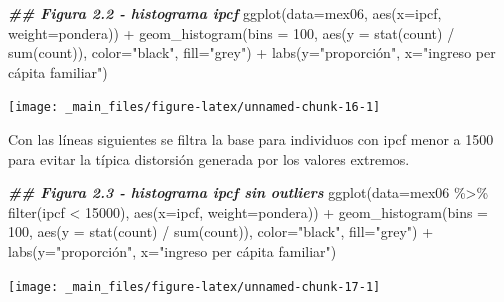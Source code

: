 \documentclass[
]{book}
\newenvironment{Shaded}{\begin{snugshade}}{\end{snugshade}}
\newcommand{\AttributeTok}[1]{\textcolor[rgb]{0.77,0.63,0.00}{#1}}
\newcommand{\DecValTok}[1]{\textcolor[rgb]{0.00,0.00,0.81}{#1}}
\newcommand{\DocumentationTok}[1]{\textcolor[rgb]{0.56,0.35,0.01}{\textbf{\textit{#1}}}}
\newcommand{\FunctionTok}[1]{\textcolor[rgb]{0.00,0.00,0.00}{#1}}
\newcommand{\NormalTok}[1]{#1}
\newcommand{\SpecialCharTok}[1]{\textcolor[rgb]{0.00,0.00,0.00}{#1}}
\newcommand{\StringTok}[1]{\textcolor[rgb]{0.31,0.60,0.02}{#1}}
\begin{document}
\begin{Shaded}
\begin{Highlighting}[]
\DocumentationTok{\#\# Figura 2.2 {-} histograma ipcf}
\FunctionTok{ggplot}\NormalTok{(}\AttributeTok{data=}\NormalTok{mex06, }
       \FunctionTok{aes}\NormalTok{(}\AttributeTok{x=}\NormalTok{ipcf, }\AttributeTok{weight=}\NormalTok{pondera)) }\SpecialCharTok{+} 
  \FunctionTok{geom\_histogram}\NormalTok{(}\AttributeTok{bins =} \DecValTok{100}\NormalTok{, }\FunctionTok{aes}\NormalTok{(}\AttributeTok{y =} \FunctionTok{stat}\NormalTok{(count) }\SpecialCharTok{/} \FunctionTok{sum}\NormalTok{(count)),}
                 \AttributeTok{color=}\StringTok{"black"}\NormalTok{, }\AttributeTok{fill=}\StringTok{"grey"}\NormalTok{) }\SpecialCharTok{+}
  \FunctionTok{labs}\NormalTok{(}\AttributeTok{y=}\StringTok{"proporción"}\NormalTok{, }\AttributeTok{x=}\StringTok{"ingreso per cápita familiar"}\NormalTok{)}
\end{Highlighting}
\end{Shaded}

\texttt{[image: \_main\_files/figure-latex/unnamed-chunk-16-1]}

Con las líneas siguientes se filtra la base para individuos con ipcf menor a 1500 para evitar la típica distorsión generada por los valores extremos.

\begin{Shaded}
\begin{Highlighting}[]
\DocumentationTok{\#\# Figura 2.3 {-} histograma ipcf sin outliers}
\FunctionTok{ggplot}\NormalTok{(}\AttributeTok{data=}\NormalTok{mex06 }\SpecialCharTok{\%\textgreater{}\%} \FunctionTok{filter}\NormalTok{(ipcf }\SpecialCharTok{\textless{}} \DecValTok{15000}\NormalTok{), }
       \FunctionTok{aes}\NormalTok{(}\AttributeTok{x=}\NormalTok{ipcf, }\AttributeTok{weight=}\NormalTok{pondera)) }\SpecialCharTok{+} 
  \FunctionTok{geom\_histogram}\NormalTok{(}\AttributeTok{bins =} \DecValTok{100}\NormalTok{, }\FunctionTok{aes}\NormalTok{(}\AttributeTok{y =} \FunctionTok{stat}\NormalTok{(count) }\SpecialCharTok{/} \FunctionTok{sum}\NormalTok{(count)),}
                 \AttributeTok{color=}\StringTok{"black"}\NormalTok{, }\AttributeTok{fill=}\StringTok{"grey"}\NormalTok{) }\SpecialCharTok{+}
  \FunctionTok{labs}\NormalTok{(}\AttributeTok{y=}\StringTok{"proporción"}\NormalTok{, }\AttributeTok{x=}\StringTok{"ingreso per cápita familiar"}\NormalTok{)}
\end{Highlighting}
\end{Shaded}

\texttt{[image: \_main\_files/figure-latex/unnamed-chunk-17-1]}
\end{document}
